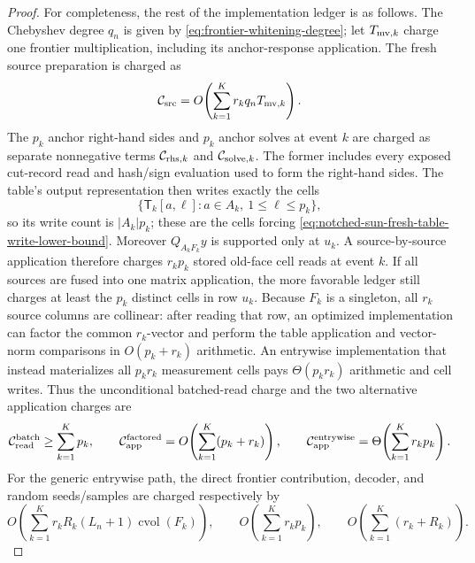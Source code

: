 \begin{proof}
For completeness, the rest of the implementation ledger is as follows.  The
Chebyshev degree $q_n$ is given by
\cref{eq:frontier-whitening-degree}; let $T_{{\rm mv},k}$ charge one
frontier multiplication, including its anchor-response application.  The
fresh source preparation is charged as
\begin{equation*}
 \mathcal C_{\rm src}
 =O\!\left(\sum_{k=1}^Kr_kq_nT_{{\rm mv},k}\right).
\end{equation*}
The $p_k$ anchor right-hand sides and $p_k$ anchor solves at event $k$ are
charged as separate nonnegative terms
$\mathcal C_{{\rm rhs},k}$ and $\mathcal C_{{\rm solve},k}$.  The former
includes every exposed cut-record read and hash/sign evaluation used to form
the right-hand sides.  The table's output representation then writes exactly
the cells
\begin{equation*}
 \{\mathsf T_k[a,\ell]:a\in A_k,\ 1\leq\ell\leq p_k\},
\end{equation*}
so its write count is $|A_k|p_k$; these are the cells forcing
\cref{eq:notched-sun-fresh-table-write-lower-bound}.  Moreover
$Q_{A_kF_k}y$ is supported only at $u_k$.  A source-by-source application
therefore charges $r_kp_k$ stored old-face cell reads at event $k$.  If all
sources are fused into one matrix application, the more favorable ledger still
charges at least the $p_k$ distinct cells in row $u_k$.  Because $F_k$ is a
singleton, all $r_k$ source columns are collinear: after reading that row, an
optimized implementation can factor the common $r_k$-vector and perform the
table application and vector-norm comparisons in $O(p_k+r_k)$ arithmetic.
An entrywise implementation that instead materializes all $p_kr_k$
measurement cells pays $\Theta(p_kr_k)$ arithmetic and cell writes.  Thus the
unconditional batched-read charge and the two alternative application charges
are
\begin{equation*}
 \mathcal C_{\rm read}^{\rm batch}\geq\sum_{k=1}^Kp_k,
 \qquad
 \mathcal C_{\rm app}^{\rm factored}
 =O\!\left(\sum_{k=1}^K(p_k+r_k)\right),
 \qquad
 \mathcal C_{\rm app}^{\rm entrywise}
 =\Theta\!\left(\sum_{k=1}^Kr_kp_k\right).
\end{equation*}
For the generic entrywise path, the direct frontier contribution, decoder,
and random seeds/samples are charged respectively by
\begin{equation*}
 O\!\left(\sum_{k=1}^Kr_kR_k(L_n+1)
                  \operatorname{cvol}(F_k)\right),
 \qquad
 O\!\left(\sum_{k=1}^Kr_kp_k\right),
 \qquad
 O\!\left(\sum_{k=1}^K(r_k+R_k)\right).
\end{equation*}

\end{proof}
